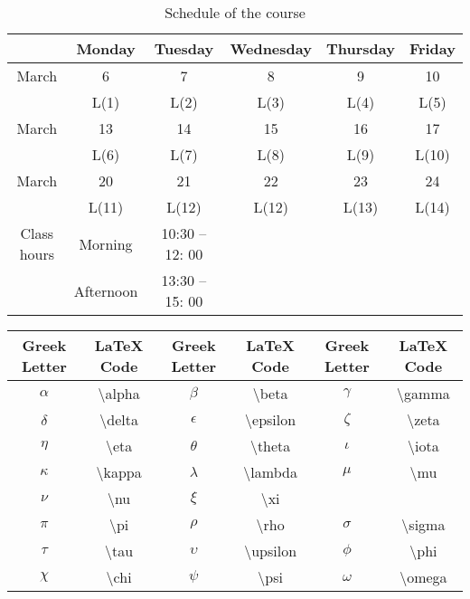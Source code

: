 \documentclass[10pt,a4paper]{book}
\theoremstyle{definition}\newtheorem{definition}{Definition}
\theoremstyle{definition}\newtheorem{fact}{Fact}
\theoremstyle{definition}\newtheorem{ex}{Ex.}
\theoremstyle{definition}\newtheorem{project}{Project}
\theoremstyle{definition}\newtheorem{problem}{Problem}
\theoremstyle{definition}\newtheorem{example}{Example}
\numberwithin{theorem}{chapter}
\numberwithin{corollary}{chapter}
\numberwithin{assumption}{chapter}
\numberwithin{definition}{chapter}
\numberwithin{prop}{chapter}
\numberwithin{notation}{chapter}
\numberwithin{problem}{chapter}
\numberwithin{example}{chapter}
\numberwithin{fact}{chapter}
\numberwithin{ex}{chapter}
\begin{document}
	\begin{table}[ht]
		\begin{tabular}{|c|c|c|c|c|c|}
			\hline
			& Monday    & Tuesday         & Wednesday & Thursday & Friday \\
			\hline
			March       & 6         & 7               & 8         & 9        & 10     \\
			& L(1)      & L(2)            & L(3)      & L(4)     & L(5)   \\
			\hline
			March       & 13        & 14              & 15        & 16       & 17     \\
			& L(6)      & L(7)            & L(8)      & L(9)     & L(10)  \\
			\hline
			March       & 20        & 21              & 22        & 23       & 24     \\
			& L(11)     & L(12)           & L(12)     & L(13)    & L(14)  \\
			\hline
			Class hours & Morning   & 10:30 -- 12: 00 &           &          &        \\
			& Afternoon & 13:30 -- 15: 00 &           &          &        \\
			\hline
		\end{tabular}
		\caption{Schedule of the course}
	\end{table}
	
	\begin{table}[ht]
		\begin{tabular}{|c|c|c|c|c|c|}
			\hline
			Greek Letter & LaTeX Code           & Greek Letter & LaTeX Code             & Greek Letter & LaTeX Code           \\
			\hline
			$\alpha$     & \textbackslash alpha & $\beta$      & \textbackslash beta    & $\gamma$     & \textbackslash gamma \\
			$\delta$     & \textbackslash delta & $\epsilon$   & \textbackslash epsilon & $\zeta$      & \textbackslash zeta  \\
			$\eta$       & \textbackslash eta   & $\theta$     & \textbackslash theta   & $\iota$      & \textbackslash iota  \\
			$\kappa$     & \textbackslash kappa & $\lambda$    & \textbackslash lambda  & $\mu$        & \textbackslash mu    \\
			$\nu$        & \textbackslash nu    & $\xi$        & \textbackslash xi      &              &                      \\
			$\pi$        & \textbackslash pi    & $\rho$       & \textbackslash rho     & $\sigma$     & \textbackslash sigma \\
			$\tau$       & \textbackslash tau   & $\upsilon$   & \textbackslash upsilon & $\phi$       & \textbackslash phi   \\
			$\chi$       & \textbackslash chi   & $\psi$       & \textbackslash psi     & $\omega$     & \textbackslash omega \\
			\hline
		\end{tabular}
	\end{table}
	
\end{document}
